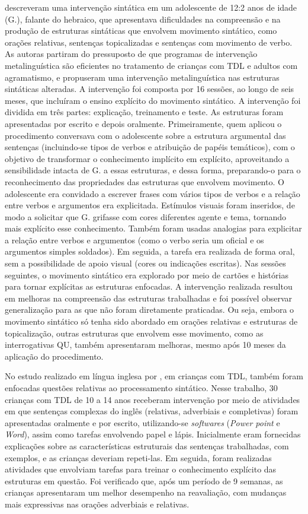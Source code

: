 \documentclass[output=paper,colorlinks,citecolor=brown,booklanguage=portuguese]{langscibook}
\begin{document}
\citet{Levy2009} descreveram uma intervenção sintática em um adolescente de 12:2 anos de idade (G.), falante do hebraico, que apresentava dificuldades na compreensão e na produção de estruturas sintáticas que envolvem movimento sintático, como orações relativas, sentenças topicalizadas e sentenças com movimento de verbo. As autoras partiram do pressuposto de que programas de intervenção metalinguística são eficientes no tratamento de crianças com TDL e adultos com agramatismo, e propuseram uma intervenção metalinguística nas estruturas sintáticas alteradas. A intervenção foi composta por 16 sessões, ao longo de seis meses, que incluíram o ensino explícito do movimento sintático. A intervenção foi dividida em três partes: explicação, treinamento e teste. As estruturas foram apresentadas por escrito e depois oralmente. Primeiramente, quem aplicou o procedimento conversava com o adolescente sobre a estrutura argumental das sentenças (incluindo-se tipos de verbos e atribuição de papéis temáticos), com o objetivo de transformar o conhecimento implícito em explícito, aproveitando a sensibilidade intacta de G. a essas estruturas, e dessa forma, preparando-o para o reconhecimento das propriedades das estruturas que envolvem movimento. O adolescente era convidado a escrever frases com vários tipos de verbos e a relação entre verbos e argumentos era explicitada. Estímulos visuais foram inseridos, de modo a solicitar que G. grifasse com cores diferentes agente e tema, tornando mais explícito esse conhecimento. Também foram usadas analogias para explicitar a relação entre verbos e argumentos (como o verbo seria um oficial e os argumentos simples soldados). Em seguida, a tarefa era realizada de forma oral, sem a possibilidade de apoio visual (cores ou indicações escritas). Nas sessões seguintes, o movimento sintático era explorado por meio de cartões e histórias para tornar explícitas as estruturas enfocadas. A intervenção realizada resultou em melhoras na compreensão das estruturas trabalhadas e foi possível observar generalização para as que não foram diretamente praticadas. Ou seja, embora o movimento sintático só tenha sido abordado em orações relativas e estruturas de topicalização, outras estruturas que envolvem esse movimento, como as interrogativas QU, também apresentaram melhoras, mesmo após 10 meses da aplicação do procedimento. 

No estudo realizado em língua inglesa por \citet{Balthazar2018}, em crianças com TDL, também foram enfocadas questões relativas ao processamento sintático. Nesse trabalho, 30 crianças com TDL de 10 a 14 anos receberam intervenção por meio de atividades em que sentenças complexas do inglês (relativas, adverbiais e completivas) foram apresentadas oralmente e por escrito, utilizan\-do-se \emph{softwares} (\emph{Power point} e \emph{Word}), assim como tarefas envolvendo papel e lápis. Inicialmente eram fornecidas explicações sobre as características estruturais das sentenças trabalhadas, com exemplos, e as crianças deveriam repeti-las. Em seguida, foram realizadas atividades que envolviam tarefas para treinar o conhecimento explícito das estruturas em questão. Foi verificado que, após um período de 9 semanas, as crianças apresentaram um melhor desempenho na reavaliação, com mudanças mais expressivas nas orações adverbiais e relativas. 
\end{document}

